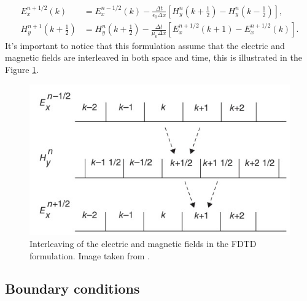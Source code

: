 \documentclass[12pt, oneside]{book}
\begin{document}
\begin{align}
    E_{x}^{n+1 / 2}(k) &=E_{x}^{n-1 / 2}(k)-\frac{\Delta t}{\epsilon_{0}  \Delta x}\left[H_{y}^{n}\left(k+\frac{1}{2}\right)-H_{y}^{n}\left(k-\frac{1}{2}\right)\right], \\
    H_{y}^{n+1}\left(k+\frac{1}{2}\right) &=H_{y}^{n}\left(k+\frac{1}{2}\right)-\frac{\Delta t}{\mu_{0}  \Delta x}\left[E_{x}^{n+1 / 2}(k+1)-E_{x}^{n+1 / 2}(k)\right].
\end{align}
It's important to notice that this formulation assume that the electric and magnetic fields are interleaved in both space and time, this is illustrated in the Figure \ref{fig:sullivaninterleaved}.
\begin{figure}[H]
    \centering
    \includegraphics[scale=0.8]{Imagenes/Sullivan_interleaved.jpg}
    \caption{Interleaving of the electric and magnetic fields in the FDTD formulation. Image taken from \cite{Sullivan2020}.}
    \label{fig:sullivaninterleaved}
\end{figure}
\subsection{Boundary conditions}
\end{document}
